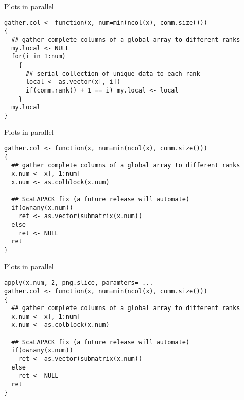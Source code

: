 \begin{frame}
  \begin{exampleblock}{Plots in parallel}\pause
\begin{lstlisting}[title=gather.col Second Attempt (2\_plot.r)]
gather.col <- function(x, num=min(ncol(x), comm.size()))
{
  ## gather complete columns of a global array to different ranks
  my.local <- NULL
  for(i in 1:num)
    {
      ## serial collection of unique data to each rank
      local <- as.vector(x[, i])
      if(comm.rank() + 1 == i) my.local <- local
    }
  my.local
}
\end{lstlisting}
  \end{exampleblock}
\end{frame}

\begin{frame}
  \begin{exampleblock}{Plots in parallel}\pause
\begin{lstlisting}[title=gather.col The almost Right Way (3\_plot.r)]
gather.col <- function(x, num=min(ncol(x), comm.size()))
{
  ## gather complete columns of a global array to different ranks
  x.num <- x[, 1:num]
  x.num <- as.colblock(x.num)

  ## ScaLAPACK fix (a future release will automate)
  if(ownany(x.num))
    ret <- as.vector(submatrix(x.num))
  else
    ret <- NULL
  ret
}
\end{lstlisting}
  \end{exampleblock}
\end{frame}

\begin{frame}
  \begin{exampleblock}{Plots in parallel}\pause
\begin{lstlisting}[title=gather.col The Easy Right Way (3\_plot.r)]
apply(x.num, 2, png.slice, paramters= ...
gather.col <- function(x, num=min(ncol(x), comm.size()))
{
  ## gather complete columns of a global array to different ranks
  x.num <- x[, 1:num]
  x.num <- as.colblock(x.num)

  ## ScaLAPACK fix (a future release will automate)
  if(ownany(x.num))
    ret <- as.vector(submatrix(x.num))
  else
    ret <- NULL
  ret
}
\end{lstlisting}
  \end{exampleblock}
\end{frame}

